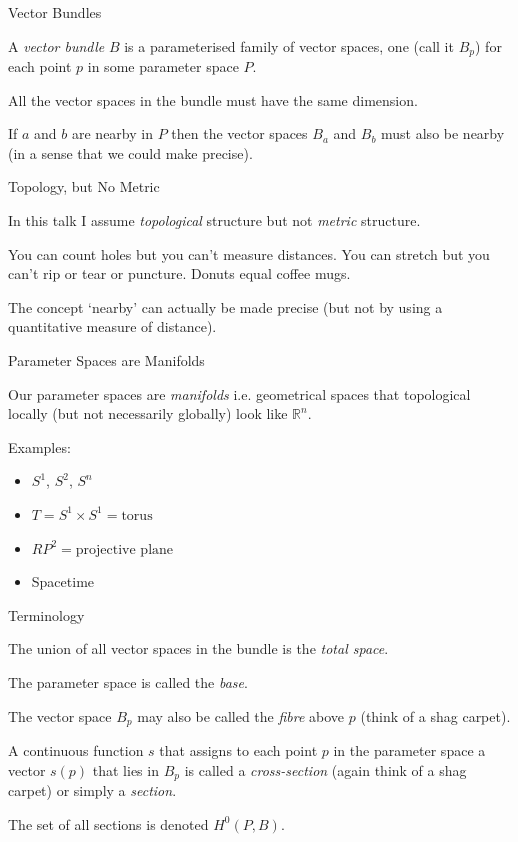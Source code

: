 \documentclass{beamer}
\begin{document}
\begin{frame}{Vector Bundles}

A \textit{vector bundle} $B$ is a parameterised family of vector spaces, one (call it $B_p$) for each point $p$ in some parameter space $P$.

All the vector spaces in the bundle must have the same dimension.

If $a$ and $b$ are nearby in $P$ then the vector spaces $B_a$ and $B_b$ must also be nearby (in a sense that we could make precise).


\end{frame}


\begin{frame}{Topology, but No Metric}

In this talk I assume \textit{topological} structure but not \textit{metric} structure.

You can count holes but you can't measure distances. You can stretch but you can't rip or tear or puncture. Donuts equal coffee mugs.

The concept `nearby' can actually be made precise (but not by using a quantitative measure of distance).

\end{frame}


\begin{frame}{Parameter Spaces are Manifolds}

Our parameter spaces are \textit{manifolds} i.e. geometrical spaces that topological locally (but not necessarily globally) look like $\mathbb{R}^n$.

Examples:
\begin{itemize}
\item{$S^1$, $S^2$, $S^n$}
\item{$T = S^1 \times S^1 = \text{torus}$}
\item{$RP^2 = \text{projective plane}$}
\item{Spacetime}
 \end{itemize}

\end{frame}


\begin{frame}{Terminology}

The union of all vector spaces in the bundle is the \textit{total space}.

The parameter space is called the \textit{base}.

The vector space $B_p$ may also be called the \textit{fibre} above $p$ (think of a shag carpet).

A continuous function $s$ that assigns to each point $p$ in the parameter space a vector $s(p)$ that lies in $B_p$ is called a \textit{cross-section} (again think of a shag carpet) or simply a \textit{section}.

The set of all sections is denoted $H^0(P, B)$.

\end{frame}
\end{document}
